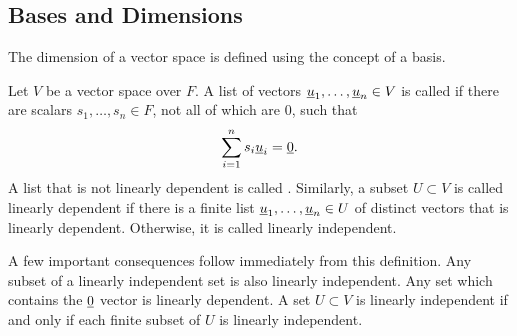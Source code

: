 \subsection{Bases and Dimensions}
\label{section:BasesAndDimensions}

The dimension of a vector space is defined using the concept of a basis.

\begin{definition}
Let $V$ be a vector space over $F$.
A list of vectors $\underline{u}_1, \ldots, \underline{u}_n \in V $ is called  if there are scalars $s_1, \ldots, s_n \in F$, not all of which are $0$, such that
\begin{equation*}
\sum_{i=1}^n s_i \underline{u}_i = \underline{0}.
\end{equation*}
A list that is not linearly dependent is called .
Similarly, a subset $U \subset V$ is called linearly dependent if there is a finite list $\underline{u}_1, \ldots, \underline{u}_n \in U$ of distinct vectors that is linearly dependent.
Otherwise, it is called linearly independent.
\end{definition}

A few important consequences follow immediately from this definition.
Any subset of a linearly independent set is also linearly independent.
Any set which contains the $\underline{0}$ vector is linearly dependent.
A set $U \subset V$ is linearly independent if and only if each finite subset of $U$ is linearly independent.

\iffalse

